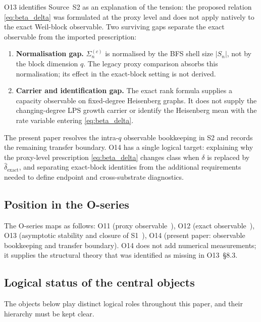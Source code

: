 \documentclass[11pt]{article}
\begin{document}
  O13 identifies Source~S2 as an explanation of the tension: the proposed relation
  \eqref{eq:beta_delta} was formulated at the proxy level and does not apply natively to
  the exact Weil-block observable.
  Two surviving gaps separate the exact observable from the imported prescription:
  \begin{enumerate}
    \item \textbf{Normalisation gap.}
    $\Sigma_n^{(c)}$ is normalised by the BFS shell size $|S_n|$, not by the block
    dimension $q$.
    The legacy proxy comparison absorbs this normalisation; its effect in the
    exact-block setting is not derived.
    \item \textbf{Carrier and identification gap.}
    The exact rank formula supplies a capacity observable on fixed-degree Heisenberg graphs.
    It does not supply the changing-degree LPS growth carrier or identify the Heisenberg mean with
    the rate variable entering \eqref{eq:beta_delta}.
  \end{enumerate}

  The present paper resolves the intra-$q$ observable bookkeeping in S2 and records the remaining
  transfer boundary.
  O14 has a single logical target: explaining why the proxy-level prescription
  \eqref{eq:beta_delta} changes class when $\delta$ is replaced by
  $\hat{\delta}_{\mathrm{exact}}$, and separating exact-block identities from the additional
  requirements needed to define endpoint and cross-substrate diagnostics.

  \subsection{Position in the O-series}
    \label{sec:position}

    The O-series maps as follows:
    O11 (proxy observable~\cite{Beau2026a15}),
    O12 (exact observable~\cite{Beau2026a16}),
    O13 (asymptotic stability and closure of S1~\cite{Beau2026a17}),
    O14 (present paper: observable bookkeeping and transfer boundary).
    O14 does not add numerical measurements; it supplies the structural theory that was identified
    as missing in O13~\S8.3.

  \subsection{Logical status of the central objects}
    \label{sec:logical_status}

    The objects below play distinct logical roles throughout this paper, and their hierarchy must
    be kept clear.
\end{document}
